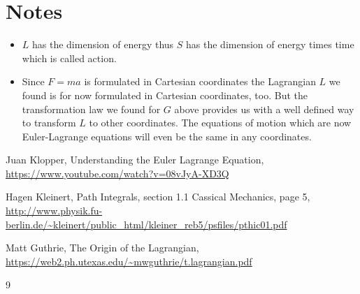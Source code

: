 \documentclass{article}
\begin{document}
\section{Notes}
\begin{itemize}
\item $L$ has the dimension of energy thus $S$ has the dimension of energy times time which is called action.
\item Since $F=ma$ is formulated in Cartesian coordinates the Lagrangian $L$ we found is for now formulated in Cartesian coordinates, too. But the transformation law we found for $G$ above provides us with a well defined way to transform $L$ to other coordinates. The equations of motion which are now Euler-Lagrange equations will even be the same in any coordinates.
\end{itemize}


\begin{thebibliography}{9}

 Juan Klopper, Understanding the Euler Lagrange Equation, \url{https://www.youtube.com/watch?v=08vJyA-XD3Q}

 Hagen Kleinert, Path Integrals, section 1.1 Cassical Mechanics, page 5, \url{http://www.physik.fu-berlin.de/~kleinert/public_html/kleiner_reb5/psfiles/pthic01.pdf}

 Matt Guthrie, The Origin of the Lagrangian, \url{https://web2.ph.utexas.edu/~mwguthrie/t.lagrangian.pdf}

\end{thebibliography}{9}
\end{document}
